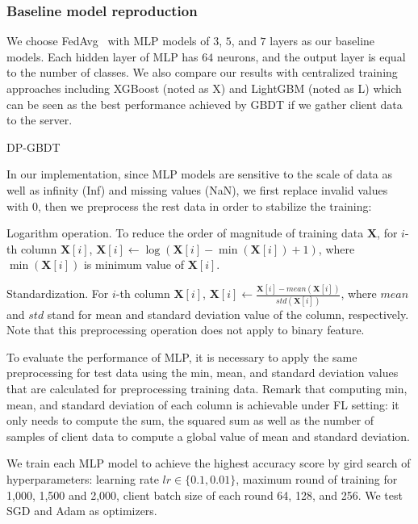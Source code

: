 \subsubsection{Baseline model reproduction}
We choose FedAvg~\cite{federated_learning} with MLP models of $3$, $5$, and $7$ layers as our baseline models. Each hidden layer of MLP has $64$ neurons, and the output layer is equal to the number of classes. We also compare our results with centralized training approaches including XGBoost\cite{xgboost} (noted as X) and
LightGBM\cite{lightgbm} (noted as L) which can be seen as the best performance achieved by GBDT if we gather client data to the server.

DP-GBDT~\cite{dpfedtree_ccs22} 


In our implementation, since MLP models are sensitive to the scale of data as well as infinity (Inf) and missing values (NaN), we first replace invalid values with $0$, then we preprocess the rest data in order to stabilize the training:

\begin{packeditemize}
    \item Logarithm operation. To reduce the order of magnitude of training data $\mathbf{X}$, for $i$-th column $\mathbf{X}[i]$, $\mathbf{X}[i]\leftarrow \log(\mathbf{X}[i]-\min(\mathbf{X}[i])+1)$, where $\min(\mathbf{X}[i])$ is minimum value of $\mathbf{X}[i]$.
    \item Standardization. For $i$-th column $\mathbf{X}[i]$, $\mathbf{X}[i]\leftarrow \frac{\mathbf{X}[i] - mean(\mathbf{X}[i])}{std(\mathbf{X}[i])}$, where $mean$ and $std$ stand for mean and standard deviation value of the column, respectively. Note that this preprocessing operation does not apply to binary feature.
\end{packeditemize}

To evaluate the performance of MLP, it is necessary to apply the same preprocessing for test data using the min, mean, and standard deviation values that are calculated for preprocessing training data.
Remark that computing min, mean, and standard deviation of each column is achievable under FL setting: it only needs to compute the sum, the squared sum as well as the number of samples of client data to compute a global value of mean and standard deviation.

We train each MLP model to achieve the highest accuracy score by gird search of hyperparameters: learning rate $lr\in\{0.1, 0.01\}$, maximum round of training for 1,000, 1,500 and 2,000, client batch size of each round 64, 128, and 256.
We test SGD and Adam\cite{adam} as optimizers.

